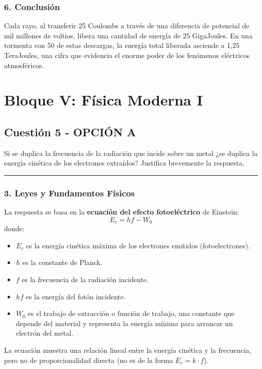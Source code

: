 \subsubsection*{6. Conclusión}
\begin{cajaconclusion}
Cada rayo, al transferir 25 Coulombs a través de una diferencia de potencial de mil millones de voltios, libera una cantidad de energía de 25 GigaJoules. En una tormenta con 50 de estas descargas, la energía total liberada asciende a 1,25 TeraJoules, una cifra que evidencia el enorme poder de los fenómenos eléctricos atmosféricos.
\end{cajaconclusion}

\newpage

\section{Bloque V: Física Moderna I}
\label{sec:moderna1_2010_jun_ord}

\subsection{Cuestión 5 - OPCIÓN A}
\label{subsec:5A_2010_jun_ord}
\begin{cajaenunciado}
Si se duplica la frecuencia de la radiación que incide sobre un metal ¿se duplica la energía cinética de los electrones extraídos? Justifica brevemente la respuesta.
\end{cajaenunciado}
\hrule

\subsubsection*{3. Leyes y Fundamentos Físicos}
La respuesta se basa en la \textbf{ecuación del efecto fotoeléctrico} de Einstein:
$$ E_c = hf - W_0 $$
donde:
\begin{itemize}
    \item $E_c$ es la energía cinética máxima de los electrones emitidos (fotoelectrones).
    \item $h$ es la constante de Planck.
    \item $f$ es la frecuencia de la radiación incidente.
    \item $hf$ es la energía del fotón incidente.
    \item $W_0$ es el trabajo de extracción o función de trabajo, una constante que depende del material y representa la energía mínima para arrancar un electrón del metal.
\end{itemize}
La ecuación muestra una relación lineal entre la energía cinética y la frecuencia, pero no de proporcionalidad directa (no es de la forma $E_c = k \cdot f$).

